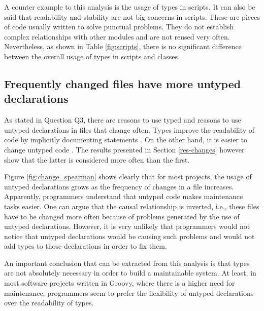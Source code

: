 \documentclass[preprint]{sigplanconf}
\begin{document}
A counter example to this analysis is the usage of types in scripts.
It can also be said that readability and stability are not big concerns in scripts.
These are pieces of code usually written to solve punctual problems.
They do not establish complex relationships with other modules and are not reused very often.
Nevertheless, as shown in Table \ref{fig:scripts}, there is no significant difference between the overall usage of types in scripts and classes.

\subsection{Frequently changed files have more untyped declarations\label{discussion-q3}}
As stated in Question Q3, there are reasons to use typed and reasons to use untyped declarations in files that change often.
Types improve the readability of code by implicitly documenting statements \cite{should_your_specification_language_be_typed}.
On the other hand, it is easier to change untyped code \cite{gradual_typing}.
The results presented in Section \ref{res-changes} however show that the latter is considered more often than the first.

Figure \ref{fig:change_spearman} shows clearly that for most projects, the usage of untyped declarations grows as the frequency of changes in a file increases.
Apparently, programmers understand that untyped code makes maintenance tasks easier.
One can argue that the causal relationship is inverted, i.e., these files have to be changed more often because of problems generated by the use of untyped declarations.
However, it is very unlikely that programmers would not notice that untyped declarations would be causing such problems and would not add types to those declarations in order to fix them.

An important conclusion that can be extracted from this analysis is that types are not absolutely necessary in order to build a maintainable system.
At least, in most software projects written in Groovy, where there is a higher need for maintenance, programmers seem to prefer the flexibility of untyped declarations over the readability of types.


\end{document}
